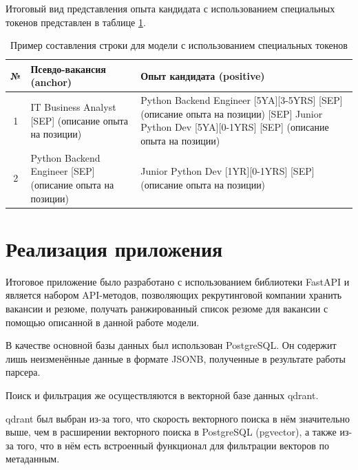 \documentclass[14pt]{mmcs_article}
\begin{document}
Итоговый вид представления опыта кандидата с использованием специальных токенов представлен в таблице \ref{tab:position_encoding_example_2}.

\begin{table}[H]
  \centering
  \caption{\centering Пример составления строки для модели с использованием специальных токенов}
  \label{tab:position_encoding_example_2}
  \begin{tabular}{|c|p{7cm}|p{7cm}|}
    \hline
    \textbf{№} & \textbf{Псевдо-вакансия (anchor)}                         & \textbf{Опыт кандидата (positive)}                                                                                                              \\
    \hline
    1          & IT Business Analyst [SEP] (описание опыта на позиции)     & Python Backend Engineer [5YA][3-5YRS] [SEP] (описание опыта на позиции) [SEP] Junior Python Dev [5YA][0-1YRS] [SEP] (описание опыта на позиции) \\
    \hline
    2          & Python Backend Engineer [SEP] (описание опыта на позиции) & Junior Python Dev [1YR][0-1YRS] [SEP] (описание опыта на позиции)                                                                               \\
    \hline
  \end{tabular}
\end{table}


\newpage
\section{Реализация приложения}\label{implementation}

Итоговое приложение было разработано с использованием библиотеки FastAPI и является набором API-методов, позволяющих рекрутинговой компании хранить вакансии и резюме, получать ранжированный список резюме для вакансии с помощью описанной в данной работе модели.

В качестве основной базы данных был использован PostgreSQL. Он содержит лишь неизменённые данные в формате JSONB, полученные в результате работы парсера.

Поиск и фильтрация же осуществляются в векторной базе данных qdrant.

qdrant был выбран из-за того, что скорость векторного поиска в нём значительно выше, чем в расширении векторного поиска в PostgreSQL (pgvector), а также из-за того, что в нём есть встроенный функционал для фильтрации векторов по метаданным.
\end{document}
